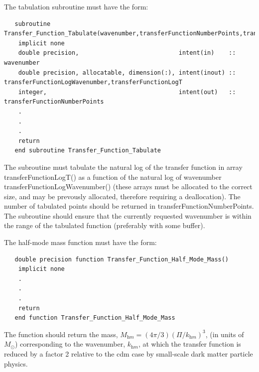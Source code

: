 The tabulation subroutine must have the form:
\begin{verbatim}
   subroutine Transfer_Function_Tabulate(wavenumber,transferFunctionNumberPoints,transferFunctionWavenumber,transferFunctionT)
    implicit none
    double precision,                            intent(in)    :: wavenumber
    double precision, allocatable, dimension(:), intent(inout) :: transferFunctionLogWavenumber,transferFunctionLogT
    integer,                                     intent(out)   :: transferFunctionNumberPoints
    .
    .
    .
    return
   end subroutine Transfer_Function_Tabulate
\end{verbatim}
The subroutine must tabulate the natural log of the transfer function in array {\normalfont \ttfamily transferFunctionLogT()} as a function of the natural log of wavenumber {\normalfont \ttfamily transferFunctionLogWavenumber()} (these arrays must be allocated to the correct size, and may be prevously allocated, therefore requiring a deallocation). The number of tabulated points should be returned in {\normalfont \ttfamily transferFunctionNumberPoints}. The subroutine should ensure that the currently requested {\normalfont \ttfamily wavenumber} is within the range of the tabulated function (preferably with some buffer).

The half-mode mass function must have the form:
\begin{verbatim}
   double precision function Transfer_Function_Half_Mode_Mass()
    implicit none
    .
    .
    .
    return
   end function Transfer_Function_Half_Mode_Mass
\end{verbatim}
The function should return the mass, $M_{\mathrm hm} = (4 \pi / 3 ) (\Pi/k_{\mathrm hm})^3$, (in units of $M_\odot$) corresponding to the wavenumber, $k_{\mathrm hm}$, at which the transfer function is reduced by a factor 2 relative to the \gls{cdm} case by small-scale dark matter particle physics. 

